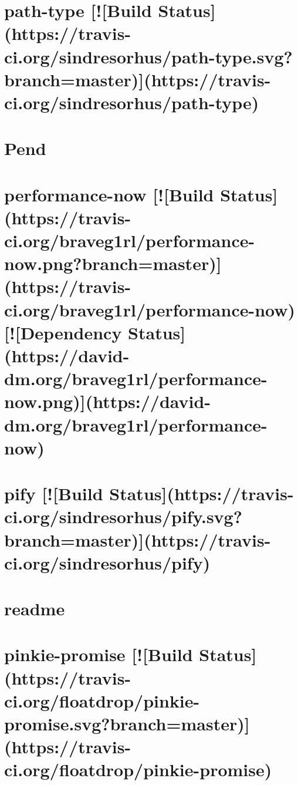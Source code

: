 \documentclass[twoside]{book}
\newcommand{\+}{\discretionary{\mbox{\scriptsize$\hookleftarrow$}}{}{}}
\begin{document}
\chapter{path-\/type \mbox{[}!\mbox{[}Build Status\mbox{]}(https\+://travis-\/ci.org/sindresorhus/path-\/type.svg?branch=master)\mbox{]}(https\+://travis-\/ci.org/sindresorhus/path-\/type)}
\label{md_dsmacc_vis_degree_node_modules_path-type_readme}

\chapter{Pend}
\label{md_dsmacc_vis_degree_node_modules_pend_README}

\chapter{performance-\/now \mbox{[}!\mbox{[}Build Status\mbox{]}(https\+://travis-\/ci.org/braveg1rl/performance-\/now.png?branch=master)\mbox{]}(https\+://travis-\/ci.org/braveg1rl/performance-\/now) \mbox{[}!\mbox{[}Dependency Status\mbox{]}(https\+://david-\/dm.org/braveg1rl/performance-\/now.png)\mbox{]}(https\+://david-\/dm.org/braveg1rl/performance-\/now)}
\label{md_dsmacc_vis_degree_node_modules_performance-now_README}

\chapter{pify \mbox{[}!\mbox{[}Build Status\mbox{]}(https\+://travis-\/ci.org/sindresorhus/pify.svg?branch=master)\mbox{]}(https\+://travis-\/ci.org/sindresorhus/pify)}
\label{md_dsmacc_vis_degree_node_modules_pify_readme}

\chapter{readme}
\label{md_dsmacc_vis_degree_node_modules_pinkie_readme}

\chapter{pinkie-\/promise \mbox{[}!\mbox{[}Build Status\mbox{]}(https\+://travis-\/ci.org/floatdrop/pinkie-\/promise.svg?branch=master)\mbox{]}(https\+://travis-\/ci.org/floatdrop/pinkie-\/promise)}
\label{md_dsmacc_vis_degree_node_modules_pinkie-promise_readme}

\end{document}
